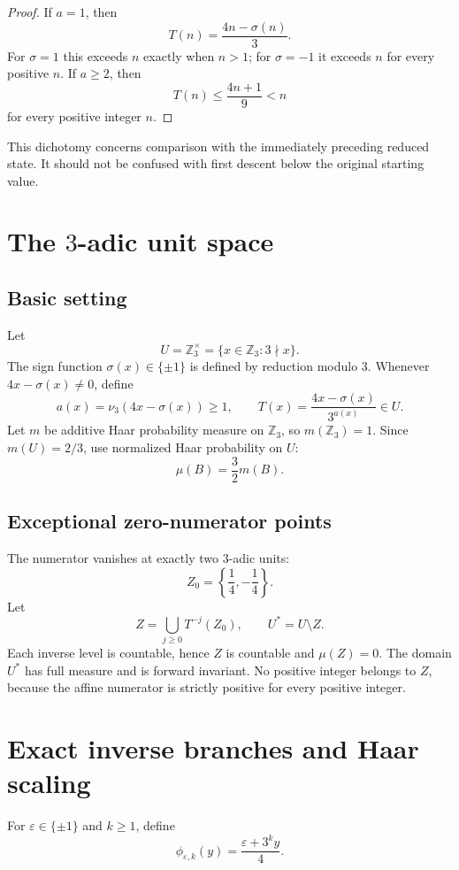 \documentclass[11pt]{article}
\theoremstyle{definition}
\theoremstyle{remark}
\newcommand{\vthree}{\nu_3}
\newcommand{\Zthree}{\mathbb Z_3}
\begin{document}
\begin{proof}
If $a=1$, then
\[
T(n)=\frac{4n-\sigma(n)}3.
\]
For $\sigma=1$ this exceeds $n$ exactly when $n>1$; for $\sigma=-1$ it exceeds $n$ for every positive $n$.  If $a\ge2$, then
\[
T(n)\le\frac{4n+1}{9}<n
\]
for every positive integer $n$.
\end{proof}

This dichotomy concerns comparison with the immediately preceding reduced state.  It should not be confused with first descent below the original starting value.

\section{The $3$-adic unit space}

\subsection{Basic setting}

Let
\[
U=\Zthree^\times=\{x\in\Zthree:3\nmid x\}.
\]
The sign function $\sigma(x)\in\{\pm1\}$ is defined by reduction modulo $3$.  Whenever $4x-\sigma(x)\ne0$, define
\[
a(x)=\vthree(4x-\sigma(x))\ge1,
\qquad
T(x)=\frac{4x-\sigma(x)}{3^{a(x)}}\in U.
\]
Let $m$ be additive Haar probability measure on $\Zthree$, so $m(\Zthree)=1$.  Since $m(U)=2/3$, use normalized Haar probability on $U$:
\[
\mu(B)=\frac{3}{2}m(B).
\]

\subsection{Exceptional zero-numerator points}

The numerator vanishes at exactly two $3$-adic units:
\[
Z_0=\left\{\frac14,-\frac14\right\}.
\]
Let
\[
Z=\bigcup_{j\ge0}T^{-j}(Z_0),
\qquad
U^\ast=U\setminus Z.
\]
Each inverse level is countable, hence $Z$ is countable and $\mu(Z)=0$.  The domain $U^\ast$ has full measure and is forward invariant.  No positive integer belongs to $Z$, because the affine numerator is strictly positive for every positive integer.

\section{Exact inverse branches and Haar scaling}

For $\varepsilon\in\{\pm1\}$ and $k\ge1$, define
\begin{equation}
\phi_{\varepsilon,k}(y)=\frac{\varepsilon+3^k y}{4}.
\label{eq:inverse-branch}
\end{equation}
\end{document}
